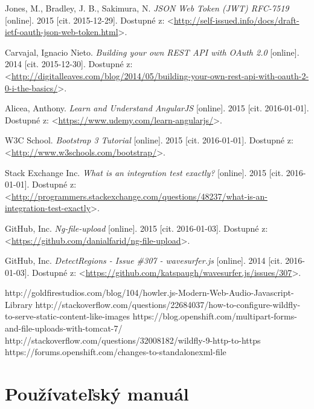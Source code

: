 \documentclass[12pt,oneside]{fithesis2}
\begin{document}
\begin{thebibliography}{59}
  		Jones, M., Bradley, J. B., Sakimura, N.
  		\emph{JSON Web Token (JWT) RFC-7519}
  		[online].
  		2015
  		[cit. 2015-12-29].
  		Dostupné z: <\url{http://self-issued.info/docs/draft-ietf-oauth-json-web-token.html}>.
 		
  		Carvajal, Ignacio Nieto.
  		\emph{Building your own REST API with OAuth 2.0}
  		[online].
  		2014
  		[cit. 2015-12-30].
  		Dostupné z: <\url{http://digitalleaves.com/blog/2014/05/building-your-own-rest-api-with-oauth-2-0-i-the-basics/}>.
  		
  		Alicea, Anthony.
  		\emph{Learn and Understand AngularJS}
  		[online].
  		2015
  		[cit. 2016-01-01].
  		Dostupné z: <\url{https://www.udemy.com/learn-angularjs/}>.
  		
  		W3C School.
  		\emph{Bootstrap 3 Tutorial}
  		[online].
  		2015
  		[cit. 2016-01-01].
  		Dostupné z: <\url{http://www.w3schools.com/bootstrap/}>.
  		
  		Stack Exchange Inc.
  		\emph{What is an integration test exactly?}
  		[online].
  		2015
  		[cit. 2016-01-01].
  		Dostupné z: <\url{http://programmers.stackexchange.com/questions/48237/what-is-an-integration-test-exactly}>.
  		
  		GitHub, Inc.
  		\emph{Ng-file-upload}
  		[online].
  		2015
  		[cit. 2016-01-03].
  		Dostupné z: <\url{https://github.com/danialfarid/ng-file-upload}>.
  		
  		GitHub, Inc.
  		\emph{DetectRegions - Issue \#307 - wavesurfer.js}
  		[online].
  		2014
  		[cit. 2016-01-03].
  		Dostupné z: <\url{https://github.com/katspaugh/wavesurfer.js/issues/307}>.
  		
  		
  		http://goldfirestudios.com/blog/104/howler.js-Modern-Web-Audio-Javascript-Library
  		http://stackoverflow.com/questions/22684037/how-to-configure-wildfly-to-serve-static-content-like-images
  		https://blog.openshift.com/multipart-forms-and-file-uploads-with-tomcat-7/
  		http://stackoverflow.com/questions/32008182/wildfly-9-http-to-https
  		https://forums.openshift.com/changes-to-standalonexml-file
  		
  		  			
	\end{thebibliography} 
	
    \appendix
    \chapter{Používateľský manuál} 	  %
\end{document}
